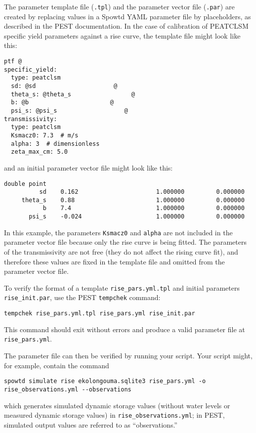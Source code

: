 \documentclass[11pt,a4paper]{article}
\begin{document}
The parameter template file (\texttt{.tpl}) and the parameter vector
file (\texttt{.par}) are created by replacing values in a Spowtd YAML
parameter file by placeholders, as described in the PEST
documentation.  In the case of calibration of PEATCLSM specific yield
parameters against a rise curve, the template file might look like this:
\begin{lstlisting}[frame=single]
ptf @
specific_yield:
  type: peatclsm
  sd: @sd                      @
  theta_s: @theta_s                 @
  b: @b                       @
  psi_s: @psi_s                   @
transmissivity:
  type: peatclsm
  Ksmacz0: 7.3  # m/s
  alpha: 3  # dimensionless
  zeta_max_cm: 5.0
\end{lstlisting}
and an initial parameter vector file might look like this:
\begin{lstlisting}[frame=single]
double point
          sd    0.162                      1.000000         0.000000
     theta_s    0.88                       1.000000         0.000000
           b    7.4                        1.000000         0.000000
       psi_s    -0.024                     1.000000         0.000000
\end{lstlisting}
In this example, the parameters \texttt{Ksmacz0} and \texttt{alpha}
are not included in the parameter vector file because only the rise
curve is being fitted.  The parameters of the transmissivity are not
free (they do not affect the rising curve fit), and therefore these
values are fixed in the template file and omitted from the parameter
vector file.

To verify the format of a template \texttt{rise\_pars.yml.tpl} and
initial parameters \texttt{rise\_init.par}, use the PEST
\texttt{tempchek} command:
\begin{lstlisting}[frame=single]
tempchek rise_pars.yml.tpl rise_pars.yml rise_init.par
\end{lstlisting}
This command should exit without errors and produce a valid parameter
file at \texttt{rise\_pars.yml}.

The parameter file can then be verified by running your script.  Your
script might, for example, contain the command
\begin{lstlisting}[frame=single]
spowtd simulate rise ekolongouma.sqlite3 rise_pars.yml -o rise_observations.yml --observations
\end{lstlisting}
which generates simulated dynamic storage values (without water levels
or measured dynamic storage values) in
\texttt{rise\_observations.yml}; in PEST, simulated output values are
referred to as ``observations.''
\end{document}

